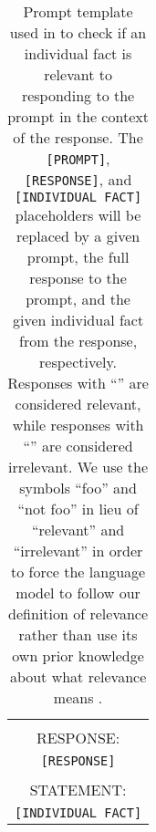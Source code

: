 \begin{table}[th]
\begin{tabular}{c}
{            \\
            RESPONSE:\\
            \texttt{[RESPONSE]}\\
            \\
            STATEMENT:\\
            \texttt{[INDIVIDUAL FACT]}
        } \\
        \bottomrule
    \end{tabular}
    \vspace{-1mm}
    \caption{
    Prompt template used in \safe{} to check if an individual fact is relevant to responding to the prompt in the context of the response.
    The \texttt{[PROMPT]},\texttt{[RESPONSE]}, and \texttt{[INDIVIDUAL FACT]} placeholders will be replaced by a given prompt, the full response to the prompt, and the given individual fact from the response, respectively.
    Responses with ``'' are considered relevant, while responses with ``'' are considered irrelevant.
    We use the symbols ``foo'' and ``not foo'' in lieu of ``relevant'' and ``irrelevant'' in order to force the language model to follow our definition of relevance rather than use its own prior knowledge about what relevance means \citep{wei2023larger,wei2023symbol}.
    }
    \label{tab:safe-relevance-prompt-template}
\end{table}